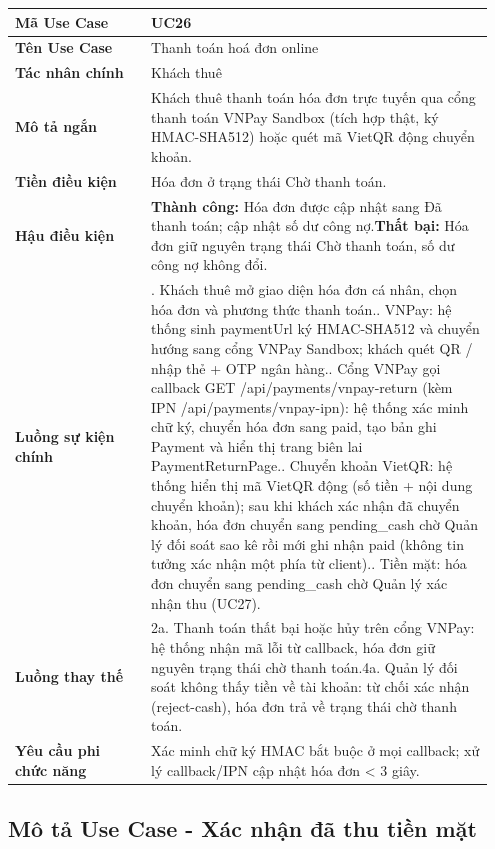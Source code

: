 \documentclass[a4paper,oneside]{report}
\begin{document}
\begin{longtable}[]{@{}>{\RaggedRight\arraybackslash}p{0.27\linewidth}>{\RaggedRight\arraybackslash}p{0.68\linewidth}@{}}
\toprule
\textbf{Mã Use Case} & UC26\tabularnewline
\midrule
\endhead
\textbf{Tên Use Case} & Thanh toán hoá đơn online\tabularnewline
\textbf{Tác nhân chính} & Khách thuê\tabularnewline
\textbf{Mô tả ngắn} & Khách thuê thanh toán hóa đơn trực tuyến qua cổng
thanh toán VNPay Sandbox (tích hợp thật, ký HMAC-SHA512) hoặc quét mã
VietQR động chuyển khoản.\tabularnewline
\textbf{Tiền điều kiện} & Hóa đơn ở trạng thái Chờ thanh
toán.\tabularnewline
\textbf{Hậu điều kiện} & \textbf{Thành công:} Hóa đơn được cập nhật sang Đã thanh toán; cập nhật số dư công nợ.\newline \textbf{Thất bại:} Hóa đơn giữ nguyên trạng thái Chờ thanh toán, số dư công nợ không đổi.\tabularnewline
\textbf{Luồng sự kiện chính} & 1. Khách thuê mở giao
diện hóa đơn cá nhân, chọn hóa đơn và phương thức thanh
toán.\newline 2. VNPay: hệ thống sinh paymentUrl ký HMAC-SHA512 và
chuyển hướng sang cổng VNPay Sandbox; khách quét QR / nhập thẻ + OTP
ngân hàng.\newline 3. Cổng VNPay gọi callback GET
/api/payments/vnpay-return (kèm IPN /api/payments/vnpay-ipn): hệ thống
xác minh chữ ký, chuyển hóa đơn sang paid, tạo bản ghi Payment và hiển
thị trang biên lai PaymentReturnPage.\newline 4. Chuyển khoản
VietQR: hệ thống hiển thị mã VietQR động (số tiền + nội dung chuyển
khoản); sau khi khách xác nhận đã chuyển khoản, hóa đơn chuyển sang
pending\_cash chờ Quản lý đối soát sao kê rồi mới ghi nhận paid (không
tin tưởng xác nhận một phía từ client).\newline 5. Tiền mặt: hóa
đơn chuyển sang pending\_cash chờ Quản lý xác nhận thu
(UC27).\tabularnewline
\textbf{Luồng thay thế} & 2a. Thanh toán thất bại
hoặc hủy trên cổng VNPay: hệ thống nhận mã lỗi từ callback, hóa đơn giữ
nguyên trạng thái chờ thanh toán.\newline 4a. Quản lý đối soát
không thấy tiền về tài khoản: từ chối xác nhận (reject-cash), hóa đơn
trả về trạng thái chờ thanh toán.\tabularnewline
\textbf{Yêu cầu phi chức năng} & Xác minh chữ ký HMAC bắt buộc ở mọi
callback; xử lý callback/IPN cập nhật hóa đơn \textless{} 3
giây.\tabularnewline
\bottomrule
\end{longtable}

\subsection{Mô tả Use Case - Xác nhận đã thu tiền mặt}
\end{document}
